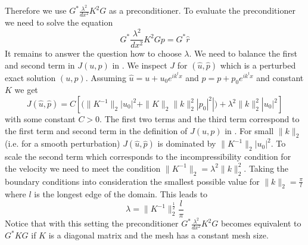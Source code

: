Therefore we use $G^* \frac{\lambda^2}{dx^2} K^2 G$ as a preconditioner.
To evaluate the preconditioner we need to solve the equation
\begin{equation}\label{UPDATE P}
 G^* \frac{\lambda^2}{dx^2} K^2 G p =  G^* \hat{r}
\end{equation}
It remains to answer the question how to choose $\lambda$.
We need to balance the first and second term in $J(u,p)$ in .
We inspect $J$ for $(\hat{u}, \hat{p})$ which is a perturbed exact solution $(u,p)$.
Assuming $\hat{u}=u+u_{0}e^{ik^tx}$ and $\hat{p}=p+p_{0}e^{ik^tx}$ and
constant $K$ we get
\begin{equation}
J(\hat{u},\hat{p}) = C \left[ ( \|K^{-1}\|_{2} |u_{0}|^2 + \|K\|_{2} \|k\|_{2}^2 |p_{0}|^2| )
+ \lambda^2 \|k\|_{2}^2 |u_{0}|^2  \right]
\end{equation} 
with some constant $C>0$.
The first two terms and the third term correspond to the first term and
second term in the definition of $J(u,p)$ in .
For small $\|k\|_{2}$ (i.e. for a smooth perturbation) $J(\hat{u},\hat{p})$ is
dominated by $\|K^{-1}\|_{2} |u_{0}|^2$.
To scale the second term which corresponds to the incompressibility condition
for the velocity we need to meet the condition $\|K^{-1}\|_{2} = \lambda^2 \|k\|_{2}^2$.
Taking the boundary conditions into consideration the smallest possible value
for $\|k\|_{2} = \frac{\pi}{l}$ where $l$ is the longest edge of the domain.
This leads to
\begin{equation}\label{DARCY LAMBDA}
\lambda = \|K^{-1}\|_{2}^{\frac{1}{2}} \frac{l}{\pi}
\end{equation} 
Notice that with this setting the preconditioner
$G^* \frac{\lambda^2}{dx^2} K^2 G$ becomes equivalent to $G^* K G$ if $K$ is a
diagonal matrix and the mesh has a constant mesh size.

